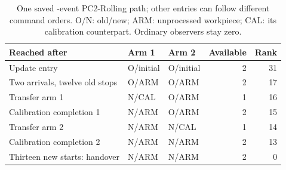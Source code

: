 \begin{table}[!htbp]
\caption{One saved \PCTwoTraceEvents{}-event PC2-Rolling path; other entries can follow different command orders. O/N: old/new; ARM: unprocessed workpiece; CAL: its calibration counterpart. Ordinary observers stay zero.}
\label{tab:pc2-saved-path}
\centering\small
\begin{tabular}{@{}p{.41\linewidth}llrr@{}}\toprule
Reached after & Arm 1 & Arm 2 & Available & Rank\\\midrule
Update entry & O/initial & O/initial & 2 & 31\\
Two arrivals, twelve old stops & O/ARM & O/ARM & 2 & 17\\
Transfer arm 1 & N/CAL & O/ARM & 1 & 16\\
Calibration completion 1 & N/ARM & O/ARM & 2 & 15\\
Transfer arm 2 & N/ARM & N/CAL & 1 & 14\\
Calibration completion 2 & N/ARM & N/ARM & 2 & 13\\
Thirteen new starts: handover & N/ARM & N/ARM & 2 & 0\\\bottomrule
\end{tabular}
\par{}
\end{table}
